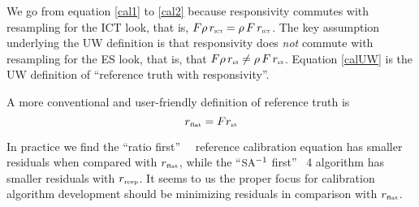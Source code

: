 \documentclass[12pt]{article}
\begin{document}
\noindent
We go from equation \ref{cal1} to \ref{cal2} because responsivity
commutes with resampling for the ICT look, that is, $F\rho\,r_{\mbox{\tiny\textsc{ict}}} =
\rho\,F\,r_{\mbox{\tiny\textsc{ict}}}$.  The key assumption underlying the UW definition is
that responsivity does {\em not} commute with resampling for the ES
look, that is, that $F\rho\,r_{\mbox{\tiny\textsc{es}}} \ne \rho\,F\,r_{\mbox{\tiny\textsc{es}}}$.  Equation
\ref{calUW} is the UW definition of ``reference truth with
responsivity''.

\vspace{2mm}
A more conventional and user-friendly definition of reference truth
is
\begin{equation}
  r_{\mbox{\tiny flat}} =  F r_{\mbox{\tiny\textsc{es}}}
\end{equation} 

\noindent
In practice we find the ``ratio first'' \umbc\ \ccast\ reference
calibration equation has smaller residuals when compared with
$r_{\mbox{\tiny flat}}$, while the ``$\mbox{\small SA}^{-1}$ first'' \noaa~4 algorithm has
smaller residuals with $r_{\mbox{\tiny resp}}$.  It seems to us the proper focus
for calibration algorithm development should be minimizing residuals
in comparison with $r_{\mbox{\tiny flat}}$.
\end{document}
